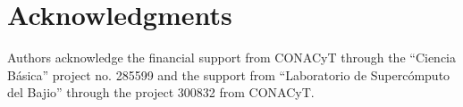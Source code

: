\documentclass[journal]{IEEEtran}
\begin{document}
\section*{Acknowledgments}
Authors acknowledge the financial support from CONACyT through the ``Ciencia B\'asica'' project no. 285599
and the support from ``Laboratorio de Superc\'omputo del Bajio'' through the project 300832 from CONACyT.


\ifCLASSOPTIONcaptionsoff
  \newpage
\fi








%



% 
\end{document}
